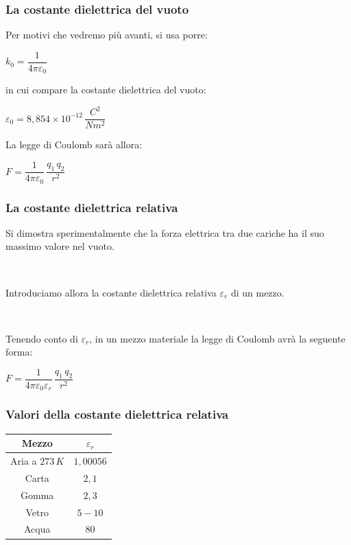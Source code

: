 \documentclass[]{beamer}
\theoremstyle{plain}
\begin{document}
\begin{frame}
\frametitle{La costante dielettrica del vuoto}
Per motivi che vedremo più avanti, si usa porre:
\begin{center}
$ k_0 = \dfrac{1}{4 \pi \varepsilon_0} $
\end{center}\pause
in cui compare la \alert{costante dielettrica del vuoto}:
\begin{center}
\colorbox{marroncino!30}{$ \varepsilon_0 = 8,854 \times 10^{-12} \,  \dfrac{C^2}{Nm^2} $}
\end{center}\pause
La legge di Coulomb sarà allora:
\begin{center}
$ F = \dfrac{1}{4 \pi \varepsilon_0} \,  \dfrac{q_1 \, q_2}{r^2} $
\end{center}
\end{frame}

\begin{frame}
\frametitle{La costante dielettrica relativa}
Si dimostra sperimentalmente che la forza elettrica tra due cariche ha il suo massimo valore nel vuoto.{\pause}

~

Introduciamo allora la \alert{costante dielettrica relativa $ \varepsilon_r $} di un mezzo.\pause

~

Tenendo conto di $ \varepsilon_r $, in un mezzo materiale la legge di Coulomb avrà la seguente forma:
\begin{center}
\colorbox{marroncino!30}{$ F = \dfrac{1}{4 \pi \varepsilon_0 \varepsilon_r} \,  \dfrac{q_1 \, q_2}{r^2} $}
\end{center}
\end{frame}





\begin{frame}
\frametitle{Valori della costante dielettrica relativa}
\centering
  \begin{tabular}{c|c}
    \textbf{Mezzo} & \textbf{$ \varepsilon_r $} \\\hline\rule{0pt}{3ex}
    Aria a $ 273 \, K $ & $ 1,00056 $ \\\rule{0pt}{3ex}
    Carta & $ 2,1 $ \\\rule{0pt}{3ex}
    Gomma & $ 2,3 $ \\\rule{0pt}{3ex}
    Vetro & $ 5-10 $ \\\rule{0pt}{3ex}
    Acqua & $ 80 $ \\
  \end{tabular}
\end{frame}
\end{document}
